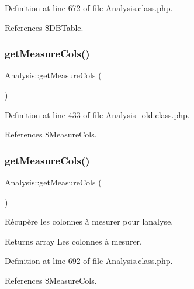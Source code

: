 Definition at line 672 of file Analysis.\+class.\+php.



References \$\+D\+B\+Table.

\mbox{\label{class_analysis_aa2139069d2b1f559a9df6f690c8cf076}} 
\subsubsection{\texorpdfstring{get\+Measure\+Cols()}{getMeasureCols()}\hspace{0.1cm}{\footnotesize\ttfamily [1/2]}}
{\footnotesize\ttfamily Analysis\+::get\+Measure\+Cols (\begin{DoxyParamCaption}{ }\end{DoxyParamCaption})}



Definition at line 433 of file Analysis\+\_\+old.\+class.\+php.



References \$\+Measure\+Cols.

\mbox{\label{class_analysis_aa2139069d2b1f559a9df6f690c8cf076}} 
\subsubsection{\texorpdfstring{get\+Measure\+Cols()}{getMeasureCols()}\hspace{0.1cm}{\footnotesize\ttfamily [2/2]}}
{\footnotesize\ttfamily Analysis\+::get\+Measure\+Cols (\begin{DoxyParamCaption}{ }\end{DoxyParamCaption})}

Récupère les colonnes à mesurer pour l\textquotesingle{}analyse.

\begin{DoxyReturn}{Returns}
array Les colonnes à mesurer. 
\end{DoxyReturn}


Definition at line 692 of file Analysis.\+class.\+php.



References \$\+Measure\+Cols.



